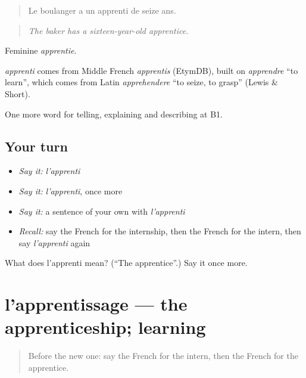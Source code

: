 \begin{quote}
Le boulanger a un apprenti de seize ans.
\end{quote}

\begin{quote}
\emph{The baker has a sixteen-year-old apprentice.}
\end{quote}

Feminine \emph{apprentie}.

\begin{cousinweb}
\emph{apprenti} comes from Middle French \emph{apprentis} (EtymDB), built on \emph{apprendre} \textquotedblleft{}to learn\textquotedblright{}, which comes from Latin \emph{apprehendere} \textquotedblleft{}to seize, to grasp\textquotedblright{} (Lewis \& Short).
\end{cousinweb}

\begin{grammarlens}[title={What you've built}]
One more word for telling, explaining and describing at B1.
\end{grammarlens}

\subsection*{Your turn}
\begin{itemize}
\raggedright
  \item \emph{Say it:} \emph{l'apprenti}
  \item \emph{Say it:} \emph{l'apprenti}, once more
  \item \emph{Say it:} a sentence of your own with \emph{l'apprenti}
  \item \emph{Recall:} say the French for the internship, then the French for the intern, then say \emph{l'apprenti} again
\end{itemize}

\begin{tcolorbox}[breakable,colback=teal!4,colframe=teal!35!black,title={Before you move on}]
What does l'apprenti mean? (\textquotedblleft{}The apprentice\textquotedblright{}.) Say it once more.
\end{tcolorbox}
\section[l'apprentissage]{l'apprentissage — the apprenticeship; learning}

\label{lesson:FR-C357-apprentissage}



\begin{quote}
Before the new one: say the French for the intern, then the French for the apprentice.
\end{quote}

